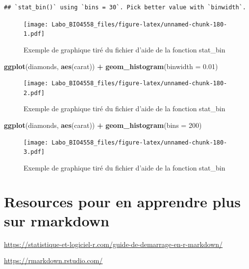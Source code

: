 \documentclass[12pt,]{book}
\newenvironment{Shaded}{\begin{snugshade}}{\end{snugshade}}
\newcommand{\DataTypeTok}[1]{\textcolor[rgb]{0.27,0.27,0.27}{#1}}
\newcommand{\DecValTok}[1]{\textcolor[rgb]{0.06,0.06,0.06}{#1}}
\newcommand{\FloatTok}[1]{\textcolor[rgb]{0.06,0.06,0.06}{#1}}
\newcommand{\KeywordTok}[1]{\textcolor[rgb]{0.27,0.27,0.27}{\textbf{#1}}}
\newcommand{\NormalTok}[1]{#1}
\newcommand{\OperatorTok}[1]{\textcolor[rgb]{0.43,0.43,0.43}{\textbf{#1}}}
\newcommand{\StringTok}[1]{\textcolor[rgb]{0.5,0.5,0.5}{#1}}
\begin{document}
\begin{verbatim}
## `stat_bin()` using `bins = 30`. Pick better value with `binwidth`.
\end{verbatim}

\begin{figure}
\centering
\texttt{[image: Labo\_BIO4558\_files/figure-latex/unnamed-chunk-180-1.pdf]}
\caption{\label{fig:unnamed-chunk-180-1}Exemple de graphique tiré du fichier d'aide de la fonction stat\_bin}
\end{figure}

\begin{Shaded}
\begin{Highlighting}[]
\KeywordTok{ggplot}\NormalTok{(diamonds, }\KeywordTok{aes}\NormalTok{(carat)) }\OperatorTok{+}
\StringTok{  }\KeywordTok{geom_histogram}\NormalTok{(}\DataTypeTok{binwidth =} \FloatTok{0.01}\NormalTok{)}
\end{Highlighting}
\end{Shaded}

\begin{figure}
\centering
\texttt{[image: Labo\_BIO4558\_files/figure-latex/unnamed-chunk-180-2.pdf]}
\caption{\label{fig:unnamed-chunk-180-2}Exemple de graphique tiré du fichier d'aide de la fonction stat\_bin}
\end{figure}

\begin{Shaded}
\begin{Highlighting}[]
\KeywordTok{ggplot}\NormalTok{(diamonds, }\KeywordTok{aes}\NormalTok{(carat)) }\OperatorTok{+}
\StringTok{  }\KeywordTok{geom_histogram}\NormalTok{(}\DataTypeTok{bins =} \DecValTok{200}\NormalTok{)}
\end{Highlighting}
\end{Shaded}

\begin{figure}
\centering
\texttt{[image: Labo\_BIO4558\_files/figure-latex/unnamed-chunk-180-3.pdf]}
\caption{\label{fig:unnamed-chunk-180-3}Exemple de graphique tiré du fichier d'aide de la fonction stat\_bin}
\end{figure}

\hypertarget{resources-pour-en-apprendre-plus-sur-rmarkdown}{%
\chapter{Resources pour en apprendre plus sur rmarkdown}\label{resources-pour-en-apprendre-plus-sur-rmarkdown}}

\url{https://statistique-et-logiciel-r.com/guide-de-demarrage-en-r-markdown/}

\url{https://rmarkdown.rstudio.com/}

\printindex
\end{document}
